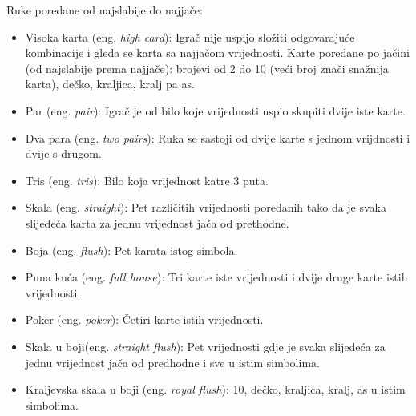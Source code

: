 Ruke poredane od najslabije do najjače:
\begin{itemize}
	\item Visoka karta (eng. \textit{high card}): Igrač nije uspijo složiti odgovarajuće kombinacije i gleda se karta sa najjačom vrijednosti. Karte poredane po jačini (od najslabije prema najjače):
	brojevi od 2 do 10 (veći broj znači snažnija karta), dečko, kraljica, kralj pa as.
	
	\item Par (eng. \textit{pair}): Igrač je od bilo koje vrijednosti uspio skupiti dvije iste karte.
	\item Dva para (eng. \textit{two pairs}): Ruka se sastoji od dvije karte s jednom vrijdnosti i dvije s drugom.
	\item Tris (eng. \textit{tris}): Bilo koja vrijednost katre 3 puta.
	\item Skala (eng. \textit{straight}): Pet različitih vrijednosti poredanih tako da je svaka slijedeća karta za jednu vrijednost jača od prethodne.
	
	\item Boja (eng. \textit{flush}): Pet karata istog simbola.
	\item Puna kuća (eng. \textit{full house}): Tri karte iste vrijednosti i dvije druge karte istih vrijednosti.
	\item Poker (eng. \textit{poker}): Četiri karte istih vrijednosti.
	\item Skala u boji(eng. \textit{straight flush}): Pet vrijednosti gdje je svaka slijedeća za jednu vrijednost jača od predhodne i sve u istim simbolima.
	
	\item Kraljevska skala u boji (eng. \textit{royal flush}): 10, dečko, kraljica, kralj, as u istim simbolima.
\end{itemize}

